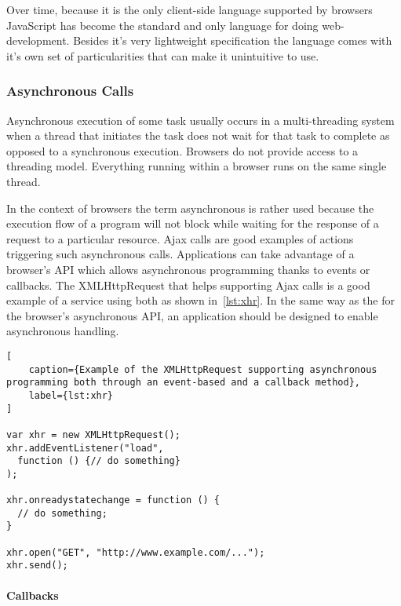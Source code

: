 Over time, because it is the only client-side language supported by browsers JavaScript has become the standard and only language for doing web-development. Besides it's very lightweight specification the language comes with it's own set of particularities that can make it unintuitive to use.

\subsubsection{Asynchronous Calls}

Asynchronous execution of some task usually occurs in a multi-threading system when a thread that initiates the task does not wait for that task to complete as opposed to a synchronous execution. Browsers do not provide access to a threading model. Everything running within a browser runs on the same single thread.

In the context of browsers the term asynchronous is rather used because the execution flow of a program will not block while waiting for the response of a request to a particular resource. Ajax calls are good examples of actions triggering such asynchronous calls. Applications can take advantage of a browser's API which allows asynchronous programming thanks to events or callbacks. The XMLHttpRequest that helps supporting Ajax calls is a good example of a service using both as shown in~\ref{lst:xhr}. In the same way as the for the browser's asynchronous API, an application should be designed to enable asynchronous handling.

\begin{lstlisting}[
    caption={Example of the XMLHttpRequest supporting asynchronous programming both through an event-based and a callback method},
    label={lst:xhr}
]

var xhr = new XMLHttpRequest();
xhr.addEventListener("load", 
  function () {// do something}
);

xhr.onreadystatechange = function () {
  // do something;
}

xhr.open("GET", "http://www.example.com/...");
xhr.send();
\end{lstlisting}

\paragraph{Callbacks}

